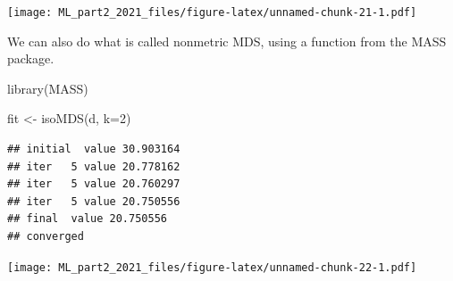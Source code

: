 \documentclass[
]{article}
\newenvironment{Shaded}{\begin{snugshade}}{\end{snugshade}}
\newcommand{\AttributeTok}[1]{\textcolor[rgb]{0.77,0.63,0.00}{#1}}
\newcommand{\CommentTok}[1]{\textcolor[rgb]{0.56,0.35,0.01}{\textit{#1}}}
\newcommand{\DecValTok}[1]{\textcolor[rgb]{0.00,0.00,0.81}{#1}}
\newcommand{\FloatTok}[1]{\textcolor[rgb]{0.00,0.00,0.81}{#1}}
\newcommand{\FunctionTok}[1]{\textcolor[rgb]{0.00,0.00,0.00}{#1}}
\newcommand{\NormalTok}[1]{#1}
\newcommand{\OtherTok}[1]{\textcolor[rgb]{0.56,0.35,0.01}{#1}}
\newcommand{\SpecialCharTok}[1]{\textcolor[rgb]{0.00,0.00,0.00}{#1}}
\newcommand{\StringTok}[1]{\textcolor[rgb]{0.31,0.60,0.02}{#1}}
\begin{document}
\begin{Shaded}
\end{Shaded}

\texttt{[image: ML\_part2\_2021\_files/figure-latex/unnamed-chunk-21-1.pdf]}

We can also do what is called nonmetric MDS, using a function from the
MASS package.

\begin{Shaded}
\begin{Highlighting}[]
\FunctionTok{library}\NormalTok{(MASS)}

\NormalTok{fit }\OtherTok{\textless{}{-}} \FunctionTok{isoMDS}\NormalTok{(d, }\AttributeTok{k=}\DecValTok{2}\NormalTok{)}
\end{Highlighting}
\end{Shaded}

\begin{verbatim}
## initial  value 30.903164 
## iter   5 value 20.778162
## iter   5 value 20.760297
## iter   5 value 20.750556
## final  value 20.750556 
## converged
\end{verbatim}

\begin{Shaded}
\end{Shaded}

\texttt{[image: ML\_part2\_2021\_files/figure-latex/unnamed-chunk-22-1.pdf]}
\end{document}
